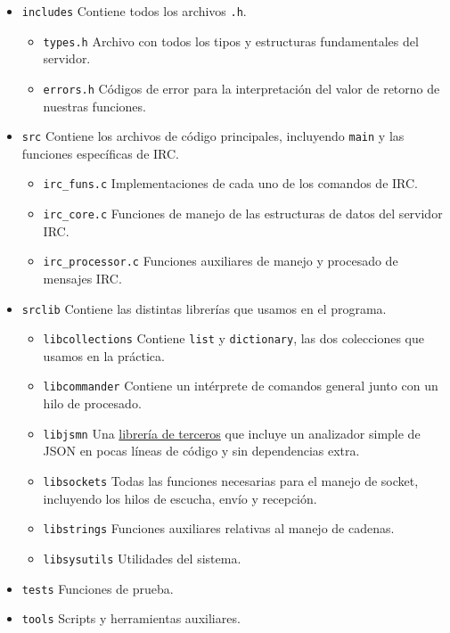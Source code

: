 \documentclass{article}
\begin{document}
\begin{itemize}
\item \texttt{includes} Contiene todos los archivos \texttt{.h}.
\begin{itemize}
\item \texttt{types.h} Archivo con todos los tipos y estructuras fundamentales del servidor.
\item \texttt{errors.h} Códigos de error para la interpretación del valor de retorno de nuestras funciones.
\end{itemize}
\item \texttt{src} Contiene los archivos de código principales, incluyendo \texttt{main} y las funciones específicas de IRC.
\begin{itemize}
\item \texttt{irc\_funs.c} Implementaciones de cada uno de los comandos de IRC.
\item \texttt{irc\_core.c} Funciones de manejo de las estructuras de datos del servidor IRC.
\item \texttt{irc\_processor.c} Funciones auxiliares de manejo y procesado de mensajes IRC.
\end{itemize}
\item \texttt{srclib} Contiene las distintas librerías que usamos en el programa.

\begin{itemize}
\item \texttt{libcollections} Contiene \texttt{list} y \texttt{dictionary}, las dos colecciones que usamos en la práctica.
\item \texttt{libcommander} Contiene un intérprete de comandos general junto con un hilo de procesado.
\item \texttt{libjsmn} Una \href{http://zserge.bitbucket.org/jsmn.html}{librería de terceros} que incluye un analizador simple de JSON en pocas líneas de código y sin dependencias extra.
\item \texttt{libsockets} Todas las funciones necesarias para el manejo de socket, incluyendo los hilos de escucha, envío y recepción.
\item \texttt{libstrings} Funciones auxiliares relativas al manejo de cadenas.
\item \texttt{libsysutils} Utilidades del sistema.
\end{itemize}
\item \texttt{tests} Funciones de prueba.
\item \texttt{tools} Scripts y herramientas auxiliares.
\end{itemize}
\end{document}
